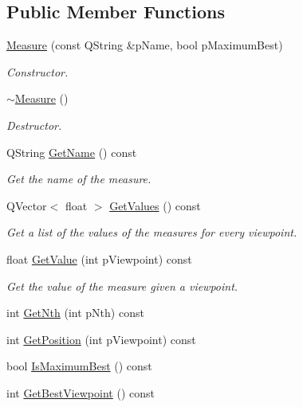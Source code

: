 \subsection*{Public Member Functions}
\begin{DoxyCompactItemize}
\item 
\hyperlink{class_measure_af854819bc1e69c18be58ef3138a9aa57}{Measure} (const Q\+String \&p\+Name, bool p\+Maximum\+Best)
\begin{DoxyCompactList}\small\item\em Constructor. \end{DoxyCompactList}\item 
\hyperlink{class_measure_aed03317ac4facea1ca4e7503b8667ef5}{$\sim$\+Measure} ()
\begin{DoxyCompactList}\small\item\em Destructor. \end{DoxyCompactList}\item 
Q\+String \hyperlink{class_measure_a970fb51394ce345cf5c172c6afa9a10f}{Get\+Name} () const 
\begin{DoxyCompactList}\small\item\em Get the name of the measure. \end{DoxyCompactList}\item 
Q\+Vector$<$ float $>$ \hyperlink{class_measure_ac90b9f0fd5741f6e2be1a5c3d48bdf79}{Get\+Values} () const 
\begin{DoxyCompactList}\small\item\em Get a list of the values of the measures for every viewpoint. \end{DoxyCompactList}\item 
float \hyperlink{class_measure_a22f11eaea82eada9a7fd44db31da503e}{Get\+Value} (int p\+Viewpoint) const 
\begin{DoxyCompactList}\small\item\em Get the value of the measure given a viewpoint. \end{DoxyCompactList}\item 
int \hyperlink{class_measure_ac4f2559d981ef3bed06d862a5216998b}{Get\+Nth} (int p\+Nth) const 
\item 
int \hyperlink{class_measure_aff33c308cc90bef66994978373ba15d9}{Get\+Position} (int p\+Viewpoint) const 
\item 
bool \hyperlink{class_measure_ae89fc789ddce3d298b14ec77a06b5860}{Is\+Maximum\+Best} () const 
\item 
int \hyperlink{class_measure_a120577cdfb75cef3a6aa2fdc94e7b138}{Get\+Best\+Viewpoint} () const 

\end{DoxyCompactItemize}
